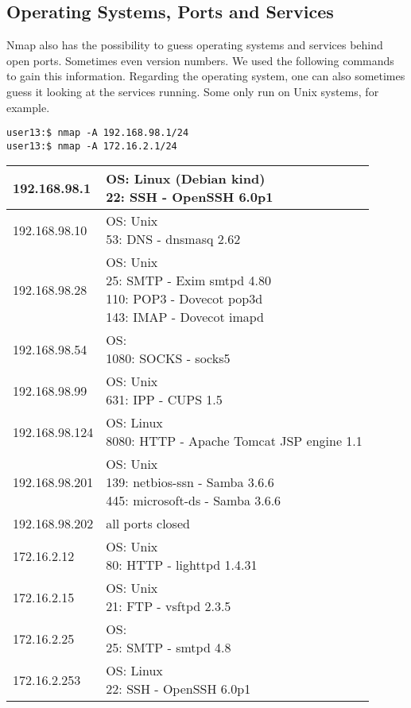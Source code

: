 \documentclass[12pt,a4paper,titlepage,oneside]{scrartcl}
\begin{document}
\subsection{Operating Systems, Ports and Services}

Nmap also has the possibility to guess operating systems and services behind open ports. Sometimes even version numbers. We used the following commands to gain this information. Regarding the operating system, one can also sometimes guess it looking at the services running. Some only run on Unix systems, for example.

\begin{lstlisting}[style=simple]
user13:$ nmap -A 192.168.98.1/24
user13:$ nmap -A 172.16.2.1/24
\end{lstlisting}

\renewcommand{\arraystretch}{2.5}
\begin{tabular}{| l | l |}
\hline
192.168.98.1 & \pbox[c]{\textwidth}{OS: Linux (Debian kind) \\ 22: SSH - OpenSSH 6.0p1} \\ \hline
192.168.98.10 & \pbox[c]{\textwidth}{OS: Unix  \\ 53: DNS - dnsmasq 2.62} \\ \hline
192.168.98.28 & \pbox[c]{\textwidth}{OS: Unix  \\ 25: SMTP - Exim smtpd 4.80 \\ 110: POP3 - Dovecot pop3d \\ 143: IMAP - Dovecot imapd} \\ \hline
192.168.98.54 & \pbox[c]{\textwidth}{ OS:  \\ 1080: SOCKS - socks5}  \\ \hline
192.168.98.99 & \pbox[c]{\textwidth}{OS: Unix  \\ 631: IPP - CUPS 1.5}  \\ \hline
192.168.98.124 & \pbox[c]{\textwidth}{OS: Linux \\ 8080: HTTP - Apache Tomcat JSP engine 1.1}  \\ \hline
192.168.98.201 & \pbox[c]{\textwidth}{OS: Unix \\ 139: netbios-ssn - Samba 3.6.6 \\ 445: microsoft-ds - Samba 3.6.6}  \\ \hline
192.168.98.202 & all ports closed  \\ \hline
172.16.2.12 & \pbox[c]{\textwidth}{OS: Unix  \\ 80: HTTP - lighttpd 1.4.31}  \\ \hline
172.16.2.15 & \pbox[c]{\textwidth}{OS: Unix \\ 21: FTP - vsftpd 2.3.5}  \\ \hline
172.16.2.25 & \pbox[c]{\textwidth}{OS:  \\ 25: SMTP - smtpd 4.8}  \\ \hline
172.16.2.253 & \pbox[c]{\textwidth}{OS: Linux \\ 22: SSH - OpenSSH 6.0p1}  \\ \hline
\end{tabular}
\end{document}
